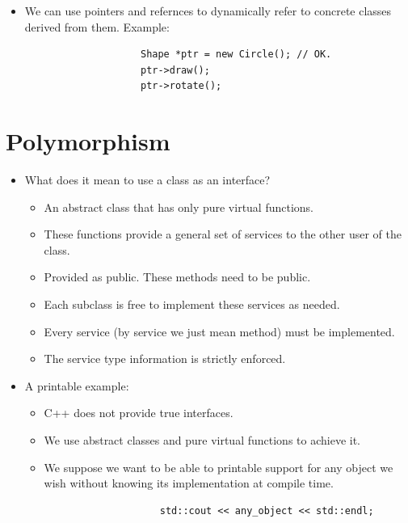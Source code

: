 \begin{itemize}
\begin{itemize}
            \item We can use pointers and refernces to dynamically refer to concrete classes derived from them. Example:
                \begin{verbatim}
                    Shape *ptr = new Circle(); // OK.
                    ptr->draw();
                    ptr->rotate();
                \end{verbatim}
        \end{itemize}
\end{itemize}

\section{Polymorphism}
\begin{itemize}
    \item What does it mean to use a class as an interface?
        \begin{itemize}
            \item An abstract class that has only pure virtual functions.
            \item These functions provide a general set of services to the other user of the class.
            \item Provided as public. These methods need to be public.
            \item Each subclass is free to implement these services as needed.
            \item Every service (by service we just mean method) must be implemented.
            \item The service type information is strictly enforced.
        \end{itemize}
    
    \item A printable example:
        \begin{itemize}
            \item C++ does not provide true interfaces.
            \item We use abstract classes and pure virtual functions to achieve it.
            \item We suppose we want to be able to printable support for any object we wish without knowing its implementation at compile time.
                \begin{verbatim}
                    std::cout << any_object << std::endl;
                \end{verbatim}
            

\end{itemize}
\end{itemize}
